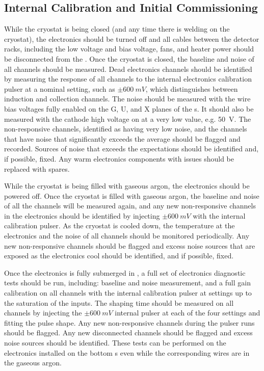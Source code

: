 \subsection{Internal Calibration and Initial Commissioning}
\label{sec:fdsp-tpcelec-integration-calib}

While the cryostat is being closed (and any time there is welding 
on the cryostat), the electronics should be turned off and all 
cables between the detector racks, including the low voltage
and bias voltage, fans, and heater power should be disconnected 
from the . Once the cryostat is closed, the baseline 
and noise of all channels should be measured. Dead electronics channels 
should be identified by measuring the response of all channels to 
the internal electronics calibration pulser at a nominal setting, 
such as $\pm\SI{600}{mV}$, which distinguishes between induction 
and collection channels. The noise should be measured with the wire bias 
voltages fully enabled on the G, U, and X planes of the s. 
It should also be measured with the cathode high voltage on at a very 
low value, e.g. \SI{50}{V}. The non-responsive channels, identified
as having very low noise, and the channels that have noise that 
significantly exceeds the average should be flagged and recorded.
Sources of noise that exceeds the expectations should be identified
and, if possible, fixed. Any warm electronics components with
issues should be replaced with spares.

While the cryostat is being filled with gaseous argon, the electronics 
should be powered off. Once the cryostat is filled with gaseous
argon, the baseline and noise of all the channels will be measured
again, and any new non-responsive channels in the electronics 
should be identified by injecting $\pm\SI{600}{mV}$ with the 
internal calibration pulser. As the cryostat is cooled down, the 
temperature at the electronics and the noise of all channels should 
be monitored periodically. Any new non-responsive channels should 
be flagged and excess noise sources that are exposed as the 
electronics cool should be identified, and if possible, fixed.

Once the electronics is fully submerged in , a full 
set of electronics diagnostic tests should be run, including: 
baseline and noise measurement, and a full gain calibration on 
all channels with the internal calibration pulser at settings 
up to the saturation of the  inputs. The shaping time 
should be measured on all channels by injecting the $\pm\SI{600}{mV}$
internal pulser at each of the four settings and fitting the 
pulse shape. Any new non-responsive channels during the pulser 
runs should be flagged. Any new disconnected channels should be 
flagged and excess noise sources should be identified. These tests 
can be performed on the electronics installed on the bottom
s even while the corresponding wires are in 
the gaseous argon.
